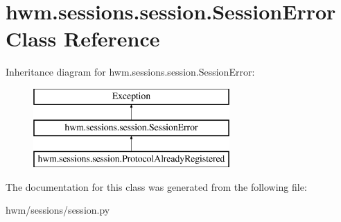 \hypertarget{classhwm_1_1sessions_1_1session_1_1_session_error}{\section{hwm.\-sessions.\-session.\-Session\-Error Class Reference}
\label{classhwm_1_1sessions_1_1session_1_1_session_error}
}
Inheritance diagram for hwm.\-sessions.\-session.\-Session\-Error\-:\begin{figure}[H]
\begin{center}
\leavevmode
\includegraphics[height=3.000000cm]{classhwm_1_1sessions_1_1session_1_1_session_error}
\end{center}
\end{figure}


The documentation for this class was generated from the following file\-:\begin{DoxyCompactItemize}
\item 
hwm/sessions/session.\-py\end{DoxyCompactItemize}
